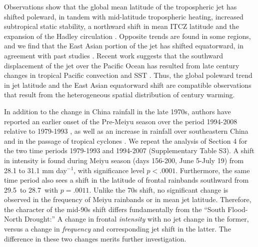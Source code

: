 \documentclass[draft,grl]{AGUTeX}
\begin{document}
\begin{article}
	
	 Observations show that the global mean latitude of the tropospheric jet has shifted poleward, in tandem with mid-latitude tropospheric heating, increased subtropical static stability, a northward shift in mean ITCZ latitude and the expansion of the Hadley circulation \citep{Fu2006,Archer2008}. Opposite trends are found in some regions, and we find that the East Asian portion of the jet has shifted equatorward, in agreement with past studies \citep{Yu2007}. Recent work suggests that the southward displacement of the jet over the Pacific Ocean has resulted from late  century changes in tropical Pacific convection and SST \citep{Park2014a}. Thus, the global poleward trend in jet latitude and the East Asian equatorward shift are compatible observations that result from the heterogeneous spatial distribution of  century warming.
	 
	 In addition to the change in China rainfall in the late 1970s, authors have reported an earlier onset of the Pre-Meiyu season over the period 1994-2008 relative to 1979-1993 \citep{Kajikawa2012}, as well as an increase in rainfall over southeastern China and in the passage of tropical cyclones \citep{Kwon2007,Chang2014}. We repeat the analysis of Section 4 for the two time periods 1979-1993 and 1994-2007 (Supplementary Table S3). A shift in intensity is found during Meiyu season (days 156-200, June 5-July 19) from 28.1 to 31.1 mm day$^{-1}$, with significance level $p<.0001$. Furthermore, the same time period also sees a shift in the latitude of frontal rainbands southward from 29.5\textdegree\ to 28.7\textdegree\ with $p=.0011$. Unlike the 70s shift, no significant change is observed in the frequency of Meiyu rainbands or in mean jet latitude. Therefore, the character of the mid-90s shift differs fundamentally from the ``South Flood-North Drought:'' A change in frontal \textit{intensity} with no jet change in the former, versus a change in \textit{frequency} and corresponding jet shift in the latter. The difference in these two changes merits further investigation.


\end{article}
\end{document}
